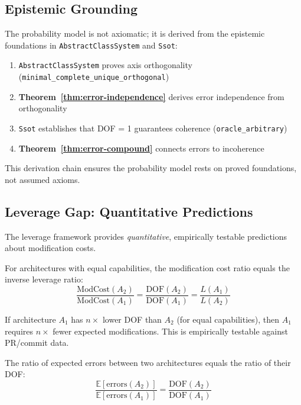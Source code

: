 \subsection{Epistemic Grounding}

The probability model is not axiomatic; it is derived from the epistemic foundations in \texttt{AbstractClassSystem} and \texttt{Ssot}:

\begin{enumerate}
\item \texttt{AbstractClassSystem} proves axis orthogonality (\texttt{minimal\_complete\_unique\_orthogonal})
\item \textbf{Theorem~\ref{thm:error-independence}} derives error independence from orthogonality
\item \texttt{Ssot} establishes that DOF = 1 guarantees coherence (\texttt{oracle\_arbitrary})
\item \textbf{Theorem~\ref{thm:error-compound}} connects errors to incoherence
\end{enumerate}

This derivation chain ensures the probability model rests on proved foundations, not assumed axioms.

\subsection{Leverage Gap: Quantitative Predictions}

The leverage framework provides \emph{quantitative}, empirically testable predictions about modification costs.

\begin{theorem}\label{thm:leverage-gap}
For architectures with equal capabilities, the modification cost ratio equals the inverse leverage ratio:
\[
\frac{\text{ModCost}(A_2)}{\text{ModCost}(A_1)} = \frac{\text{DOF}(A_2)}{\text{DOF}(A_1)} = \frac{L(A_1)}{L(A_2)}
\]
\end{theorem}

\begin{theorem}\label{thm:testable-prediction}
If architecture $A_1$ has $n\times$ lower DOF than $A_2$ (for equal capabilities), then $A_1$ requires $n\times$ fewer expected modifications. This is empirically testable against PR/commit data.
\end{theorem}

\begin{corollary}\label{cor:dof-ratio}
The ratio of expected errors between two architectures equals the ratio of their DOF:
\[
\frac{\mathbb{E}[\text{errors}(A_2)]}{\mathbb{E}[\text{errors}(A_1)]} = \frac{\text{DOF}(A_2)}{\text{DOF}(A_1)}
\]
\end{corollary}

